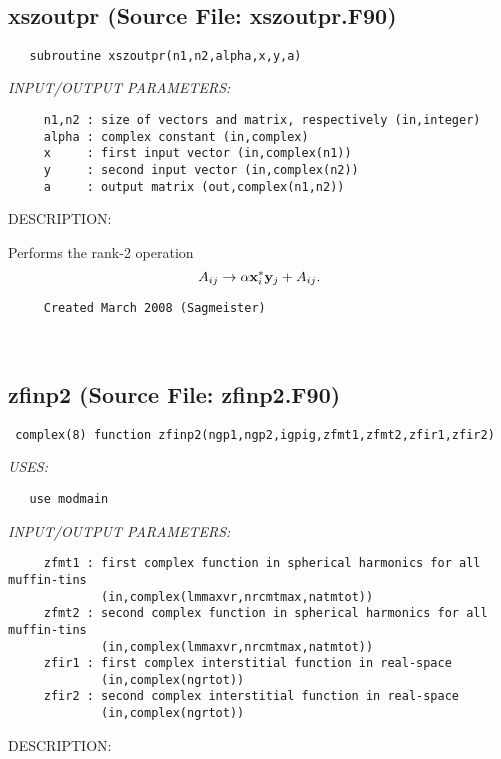 \documentclass[11pt]{article}
\begin{document}

 
 
\mbox{}\hrulefill\ 
 
\subsection{xszoutpr (Source File: xszoutpr.F90)}


\begin{verbatim}   subroutine xszoutpr(n1,n2,alpha,x,y,a)\end{verbatim}{\em INPUT/OUTPUT PARAMETERS:}
\begin{verbatim}     n1,n2 : size of vectors and matrix, respectively (in,integer)
     alpha : complex constant (in,complex)
     x     : first input vector (in,complex(n1))
     y     : second input vector (in,complex(n2))
     a     : output matrix (out,complex(n1,n2))\end{verbatim}
{\sf DESCRIPTION:\\ }


     Performs the rank-2 operation
     $$ A_{ij}\rightarrow\alpha{\bf x}_i^*{\bf y}_j+A_{ij}. $$
  
\begin{verbatim}     Created March 2008 (Sagmeister)\end{verbatim}




 
 
\mbox{}\hrulefill\ 
 
\subsection{zfinp2 (Source File: zfinp2.F90)}


\begin{verbatim} complex(8) function zfinp2(ngp1,ngp2,igpig,zfmt1,zfmt2,zfir1,zfir2)\end{verbatim}{\em USES:}
\begin{verbatim}   use modmain\end{verbatim}{\em INPUT/OUTPUT PARAMETERS:}
\begin{verbatim}     zfmt1 : first complex function in spherical harmonics for all muffin-tins
             (in,complex(lmmaxvr,nrcmtmax,natmtot))
     zfmt2 : second complex function in spherical harmonics for all muffin-tins
             (in,complex(lmmaxvr,nrcmtmax,natmtot))
     zfir1 : first complex interstitial function in real-space
             (in,complex(ngrtot))
     zfir2 : second complex interstitial function in real-space
             (in,complex(ngrtot))\end{verbatim}
{\sf DESCRIPTION:\\ }
\end{document}
